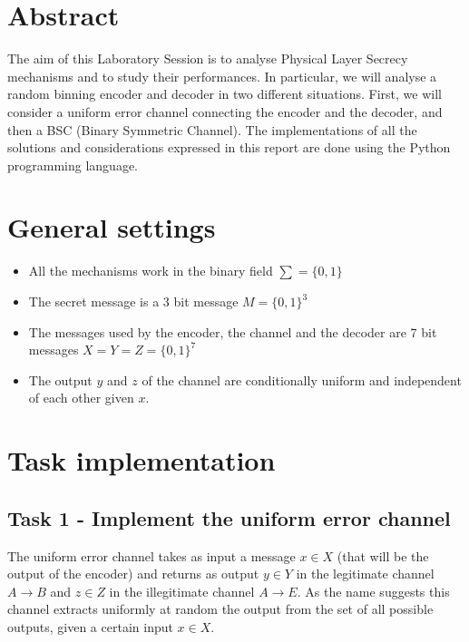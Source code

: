\documentclass{report}
\begin{document}
\begingroup
\let\clearpage\relax
\chapter*{Abstract}
\endgroup
The aim of this Laboratory Session is to analyse Physical Layer Secrecy mechanisms and to study their performances. In particular, we will analyse a random binning encoder and decoder in two different situations. First, we will consider a uniform error channel connecting the encoder and the decoder, and then a BSC (Binary Symmetric Channel). The implementations of all the solutions and considerations expressed in this report are done using the Python programming language. 





\begingroup
\let\clearpage\relax
\chapter*{General settings}
\endgroup
\begin{itemize}
\item All the mechanisms work in the binary field $\sum = \{0,1\}$ 
\item The secret message is a 3 bit message $M=\{0,1\}^3$ 
\item The messages used by the encoder, the channel and the decoder are 7 bit messages $X=Y=Z=\{0,1\}^7$
\item The output $y$ and $z$ of the channel are conditionally uniform and independent of each other given  $x$. 
\end{itemize}




\chapter*{Task implementation}
\section*{Task 1 - Implement the uniform error channel}
The uniform error channel takes as input a message $x\in X$ (that will be the output of the encoder) and returns as output $y\in Y$ in the legitimate channel $A\to B$ and $z\in Z$ in the illegitimate channel $A\to E$.  As the name suggests this channel extracts uniformly at random the output from the set of all possible outputs, given a certain input $x\in X$. 
\end{document}
